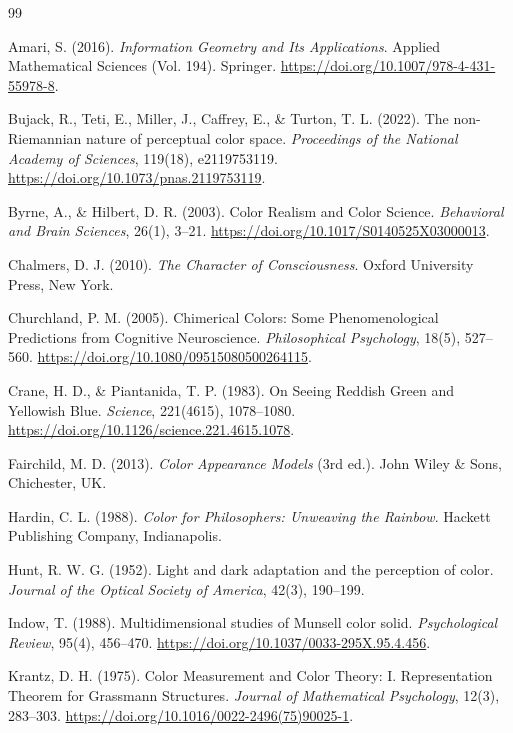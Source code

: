 \documentclass[preprint,12pt,authoryear]{elsarticle}
\theoremstyle{plain}
\theoremstyle{definition}
\theoremstyle{remark}
\begin{document}
\begin{thebibliography}{99}

Amari, S. (2016). \textit{Information Geometry and Its Applications}. Applied Mathematical Sciences (Vol. 194). Springer. \url{https://doi.org/10.1007/978-4-431-55978-8}.

Bujack, R., Teti, E., Miller, J., Caffrey, E., \& Turton, T. L. (2022). The non-Riemannian nature of perceptual color space. \textit{Proceedings of the National Academy of Sciences}, 119(18), e2119753119. \url{https://doi.org/10.1073/pnas.2119753119}.

Byrne, A., \& Hilbert, D. R. (2003). Color Realism and Color Science. \textit{Behavioral and Brain Sciences}, 26(1), 3--21. \url{https://doi.org/10.1017/S0140525X03000013}.

Chalmers, D. J. (2010). \textit{The Character of Consciousness}. Oxford University Press, New York.

Churchland, P. M. (2005). Chimerical Colors: Some Phenomenological Predictions from Cognitive Neuroscience. \textit{Philosophical Psychology}, 18(5), 527--560. \url{https://doi.org/10.1080/09515080500264115}.

Crane, H. D., \& Piantanida, T. P. (1983). On Seeing Reddish Green and Yellowish Blue. \textit{Science}, 221(4615), 1078--1080. \url{https://doi.org/10.1126/science.221.4615.1078}.

Fairchild, M. D. (2013). \textit{Color Appearance Models} (3rd ed.). John Wiley \& Sons, Chichester, UK.

Hardin, C. L. (1988). \textit{Color for Philosophers: Unweaving the Rainbow}. Hackett Publishing Company, Indianapolis.

Hunt, R. W. G. (1952). Light and dark adaptation and the perception of color. \textit{Journal of the Optical Society of America}, 42(3), 190--199.

Indow, T. (1988). Multidimensional studies of Munsell color solid. \textit{Psychological Review}, 95(4), 456--470. \url{https://doi.org/10.1037/0033-295X.95.4.456}.

Krantz, D. H. (1975). Color Measurement and Color Theory: I. Representation Theorem for Grassmann Structures. \textit{Journal of Mathematical Psychology}, 12(3), 283--303. \url{https://doi.org/10.1016/0022-2496(75)90025-1}.


\end{thebibliography}
\end{document}
